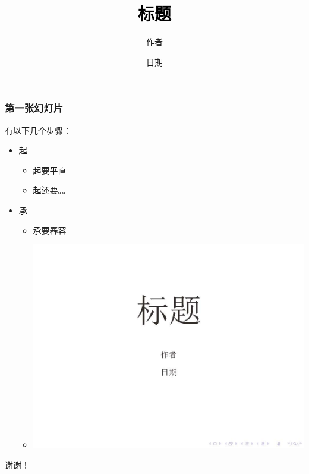 \documentclass[UTF8, t]{beamer}
\title{\fontsize{44}{\baselineskip}\selectfont \textcolor{black}{标题}}
\author{\vspace{-20pt}作者}
\date{日期}
\begin{document}
\begin{frame}
    \titlepage
\end{frame}

\begin{frame}
    \frametitle{第一张幻灯片}
    有以下几个步骤：
    \pause
    \begin{itemize}
        \item 起
            \begin{itemize}
                \item 起要平直
                \item 起还要。。
            \end{itemize}
            \pause
        \item 承
            \begin{itemize}
                \item 承要舂容
                \item \includegraphics[width=.2\paperwidth]{preview/ppt_1.jpg}
            \end{itemize}
    \end{itemize}
\end{frame}

\begin{frame}
    \vspace{3cm}
    \begin{center}
        \fontsize{54}{\baselineskip}\selectfont 谢谢！
    \end{center}
\end{frame}
\end{document}
